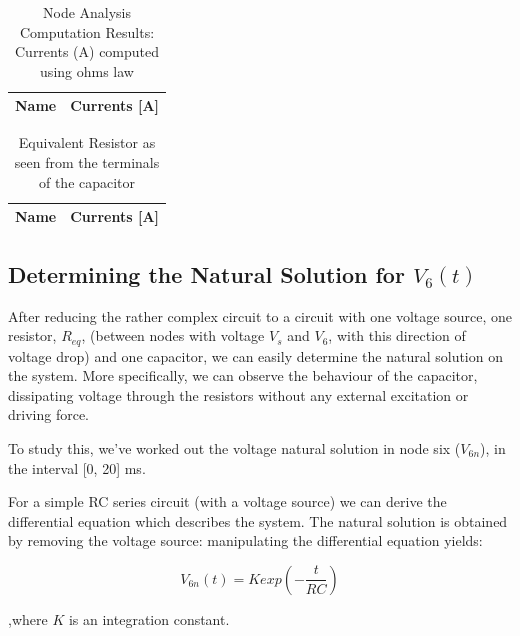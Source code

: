 \begin{table}[h]
  \centering
  \begin{tabular}{|l|r|}
    \hline    
    {\bf Name} & {\bf Currents [A]} \\ \hline
    
  \end{tabular}
  \caption{Node Analysis Computation Results: Currents (A) computed using ohms law}
  \label{tab:nodeCurrents2}
\end{table}

\begin{table}[h]
  \centering
  \begin{tabular}{|l|r|}
    \hline    
    {\bf Name} & {\bf Currents [A]} \\ \hline
    
  \end{tabular}
  \caption{Equivalent Resistor as seen from the terminals of the capacitor}
  \label{tab:Req}
\end{table}



\clearpage
\subsection{Determining the Natural Solution for $V_6(t)$}

After reducing the rather complex circuit to a circuit with one voltage source, one resistor, $R_{eq}$, (between nodes with voltage $V_s$ and $V_6$, with this direction of voltage drop) and one capacitor, we can easily determine the natural solution on the system. More specifically, we can observe the behaviour of the capacitor, dissipating voltage through the resistors without any external excitation or driving force. 

To study this, we've worked out the voltage natural solution in node six ($V_{6n}$), in the interval [0, 20] ms.

For a simple RC series circuit (with a voltage source) we can derive the differential equation which describes the system. The natural solution is obtained by removing the voltage source: manipulating the differential equation yields: 

\begin{center}
  \begin{equation}
    V_{6n}(t) = K exp\left(-\frac{t}{RC}\right)
  \end{equation} 
\end{center}


,where $K$ is an integration constant.

